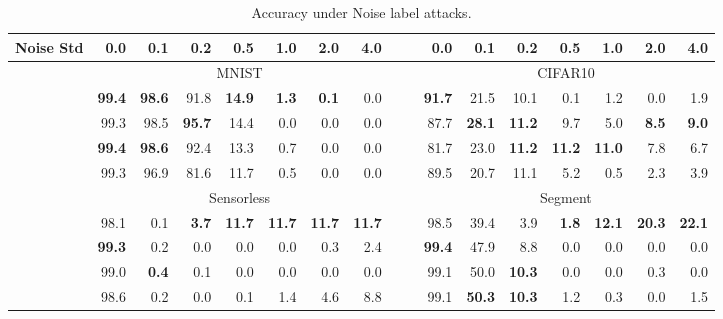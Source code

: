 \begin{table}[htbp!]
 	\centering
 	\caption{Accuracy under Noise label attacks.}
 	\begin{small}
 		\begin{tabular}{@{}rrrrrrrrc|crrrrrrr@{}}
 			\toprule
 			Noise Std & 0.0 & 0.1 & 0.2 & 0.5 & 1.0 & 2.0 & 4.0 & & & 0.0 & 0.1 & 0.2 & 0.5 & 1.0 & 2.0 & 4.0 \\
 			\midrule
 			& \multicolumn{7}{c}{MNIST} & & & \multicolumn{7}{c}{CIFAR10} \\
 			\PostNet  & \bf{99.4} &  \bf{98.6} &  91.8 &  \bf{14.9} &  \bf{1.3} &  \bf{0.1} &  0.0 & &
 			          & \bf{91.7} &  21.5 &  10.1 &   0.1 &   1.2 &  0.0 &  1.9 \\
 			\PriorNet & 99.3 &  98.5 &  \bf{95.7} &  14.4 &  0.0 &  0.0 &  0.0 & &
 			          & 87.7 &  \bf{28.1} &  \bf{11.2} &   9.7 &   5.0 &  \bf{8.5} &  \bf{9.0}\\
 		    \DDNet    & \bf{99.4} &  \bf{98.6} &  92.4 &  13.3 &  0.7 &  0.0 &  0.0 & &
 			          & 81.7 &  23.0 &  \bf{11.2} &  \bf{11.2} &  \bf{11.0} &  7.8 &  6.7 \\
 		    \EvNet    & 99.3 &  96.9 &  81.6 &  11.7 &  0.5 &  0.0 &  0.0 & &
 			          & 89.5 &  20.7 &  11.1 &   5.2 &   0.5 &  2.3 &  3.9 \\
 		    \midrule
 		     & \multicolumn{7}{c}{Sensorless} & & & \multicolumn{7}{c}{Segment} \\
 			\PostNet  & 98.1 &  0.1 &  \bf{3.7} &  \bf{11.7} &  \bf{11.7} &  \bf{11.7} &  \bf{11.7} & &
 			          & 98.5 &  39.4 &   3.9 &  \bf{1.8} &  \bf{12.1} &  \bf{20.3} &  \bf{22.1} \\
 			\PriorNet & \bf{99.3} &  0.2 &  0.0 &   0.0 &   0.0 &   0.3 &   2.4 & &
 			          & \bf{99.4} &  47.9 &   8.8 &  0.0 &   0.0 &   0.0 &   0.0 \\
 		    \DDNet    & 99.0 &  \bf{0.4} &  0.1 &   0.0 &   0.0 &   0.0 &   0.0 & &
 			          & 99.1 &  50.0 &  \bf{10.3} &  0.0 &   0.0 &   0.3 &   0.0 \\
 		    \EvNet    & 98.6 &  0.2 &  0.0 &   0.1 &   1.4 &   4.6 &   8.8 & &
 			          & 99.1 &  \bf{50.3} &  \bf{10.3} &  1.2 &   0.3 &   0.0 &   1.5 \\
 			\bottomrule
 		\end{tabular}
 	\end{small}
 	\label{tab:acc_label_attack_noise_attack}
\end{table}

